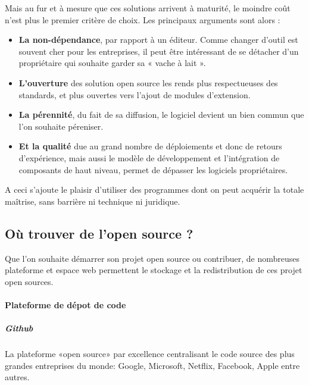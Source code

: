 				Mais au fur et à mesure que ces solutions arrivent à maturité, le moindre coût n'est plus le premier critère de choix.
				Les principaux arguments sont alors :

				\begin{itemize}[label=\textbullet, font=\LARGE \color{burntorange}]
					\item \textbf{La non-dépendance}, par rapport à un éditeur. Comme changer d'outil est souvent cher pour les entreprises, il peut être intéressant de se détacher d'un propriétaire qui souhaite garder sa « vache à lait ».
					\item \textbf{L'ouverture} des solution open source les rends plus respectueuses des standards, et plus ouvertes vers l'ajout de modules d'extension.
					\item \textbf{La pérennité}, du fait de sa diffusion, le logiciel devient un bien commun que l'on souhaite péreniser. 
					\item \textbf{Et la qualité} due au grand nombre de déploiements et donc de retours d'expérience, mais aussi le modèle de développement et l'intégration de composants de haut niveau, permet de dépasser les logiciels propriétaires.
				\end{itemize}

				A ceci s'ajoute le plaisir d'utiliser des programmes dont on peut acquérir la totale maîtrise, sans barrière ni technique ni juridique.

		\subsection{Où trouver de l'open source ?} 

			Que l'on souhaite démarrer son projet open source ou contribuer, de nombreuses plateforme et espace web permettent le stockage et la redistribution de ces projet open sources.

			\paragraph{Plateforme de dépot de code}

				\subparagraph{Github\\}
				La plateforme «open source» par excellence centralisant le code source des plus grandes entreprises du monde: Google, Microsoft, Netflix, Facebook, Apple entre autres.


